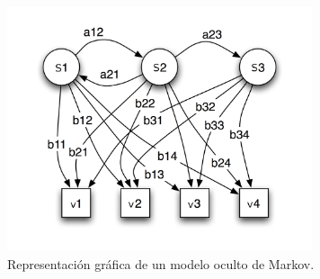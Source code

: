 \begin{figure}[H] 
\centering
\includegraphics[width=0.8\textwidth]{./graphics/hmm.png}
\caption{Representaci\'on gr\'afica de un modelo oculto de Markov.}
\label{figure:hmm}
\end{figure}